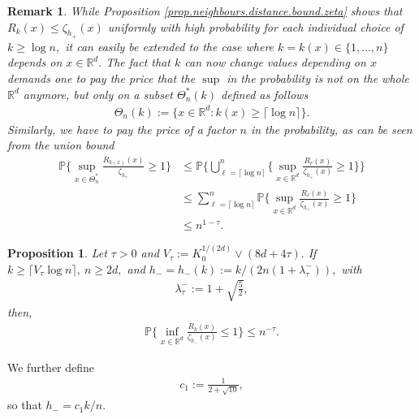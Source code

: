 \documentclass[10pt]{article}
\newcommand{\PP}{\mathbb{P}}
\newcommand{\RR}{\mathbb{R}}
\newtheorem{proposition}[theorem]{Proposition}
\newtheorem{remark}[theorem]{Remark}
\begin{document}
\begin{remark}
    \label{rem.bound.variable.k}
    While Proposition \ref{prop.neighbours.distance.bound.zeta} shows that $R_k(x) \leq \zeta_{h_+}(x)$ uniformly with high probability for each individual choice of $k \geq \log n,$ it can easily be extended to the case where $k = k(x) \in \{1, \dots, n\}$ depends on $x \in \RR^d.$ The fact that $k$ can now change values depending on $x$ demands one to pay the price that the $\sup$ in the probability is not on the whole $\RR^d$ anymore, but only on a subset $\Theta_n^*(k)$ defined as follows
    \begin{align*}
        \Theta_n(k) := \bigg\{x \in \RR^d: k(x) \geq \lceil\log n \rceil\bigg\}.
    \end{align*}
    Similarly, we have to pay the price of a factor $n$ in the probability, as can be seen from the union bound
    \begin{align*}
        \PP\Bigg\{\sup_{x \in \Theta_n^*}\frac{R_{k(x)}(x)}{\zeta_{h_+}} \geq 1\Bigg\} &\leq \PP\Bigg\{\bigcup_{\ell = \lceil \log n \rceil}^n\Bigg\{\sup_{x \in \RR^d}\frac{R_{\ell}(x)}{\zeta_{h_+}(x)} \geq 1\Bigg\} \Bigg\}\\
        &\leq \sum_{\ell = \lceil \log n \rceil}^n\PP\Bigg\{\sup_{x \in \RR^d}\frac{R_{\ell}(x)}{\zeta_{h_+}(x)}\geq 1\Bigg\}\\
        &\leq n^{1 - \tau}.
    \end{align*}
\end{remark}
\begin{proposition}
    \label{prop.neighbours.distance.lower.bound.zeta}
    Let $\tau > 0$ and $V_\tau := K_0^{1/(2d)}\vee(8d + 4\tau).$ If $k \geq \lceil V_\tau\log n\rceil, \ n\geq 2d,$ and $h_- = h_-(k) := k/(2n(1 + \lambda_\tau^-)),$ with 
    \begin{align*}
        \lambda_\tau^- := 1 + \sqrt{\frac 52},
    \end{align*}
    then,
    \begin{align*}
        \PP\Bigg\{\inf_{x \in \RR^d}\frac{R_k(x)}{\zeta_{h_-}(x)} \leq 1\Bigg\} \leq n^{-\tau}.
    \end{align*}
\end{proposition}
We further define
\begin{align}
    \label{eq.def.dtau}
    c_1 := \frac{1}{2 + \sqrt{10}},
\end{align}
so that $h_- = c_1 k/n.$
\end{document}
